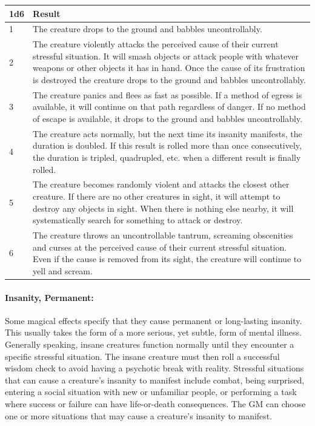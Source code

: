\begin{multicols}{2}
\noindent
\begin{minipage}{\columnwidth}

\label{insanity}
\noindent
\begin{tabular}{|p{}|p{}|}
\hline
1d6	& Result \\
\hline\hline
\rowcolor[gray]{.9}1	& The creature drops to the ground and babbles uncontrollably. \\
2	& The creature violently attacks the perceived cause of their current stressful situation.  It will smash objects or attack people with whatever weapons or other objects it has in hand.  Once the cause of its frustration is destroyed the creature drops to the ground and babbles uncontrollably. \\
\rowcolor[gray]{.9}3	& The creature panics and flees as fast as possible.  If a method of egress is available, it will continue on that path regardless of danger.  If no method of escape is available, it drops to the ground and babbles uncontrollably. \\
4	& The creature acts normally, but the next time its insanity manifests, the duration is doubled.  If this result is rolled more than once consecutively, the duration is tripled, quadrupled, etc. when a different result is finally rolled. \\
\rowcolor[gray]{.9}5	& The creature becomes randomly violent and attacks the closest other creature.  If there are no other creatures in sight, it will attempt to destroy any objects in sight.  When there is nothing else nearby, it will systematically search for something to attack or destroy. \\
6	& The creature throws an uncontrollable tantrum, screaming obscenities and curses at the perceived cause of their current stressful situation.  Even if the cause is removed from its sight, the creature will continue to yell and scream. \\
\hline
\end{tabular}

\end{minipage}

\paragraph{Insanity, Permanent:} Some magical effects specify that they cause permanent or long-lasting insanity.  This usually takes the form of a more serious, yet subtle, form of mental illness.  Generally speaking, insane creatures function normally until they encounter a specific stressful situation.  The insane creature must then roll a successful wisdom check to avoid having a psychotic break with reality.  Stressful situations that can cause a creature's insanity to manifest include combat, being surprised, entering a social situation with new or unfamiliar people, or performing a task where success or failure can have life-or-death consequences.  The GM can choose one or more situations that may cause a creature's insanity to manifest.  
 

\end{multicols}
